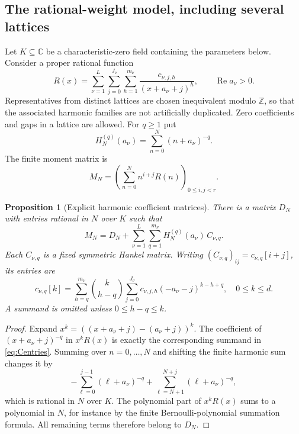 \documentclass[11pt,letterpaper]{article}
\numberwithin{equation}{section}
\newtheorem{proposition}[theorem]{Proposition}
\theoremstyle{definition}\newtheorem{definition}[theorem]{Definition}
\theoremstyle{remark}\newtheorem{remark}[theorem]{Remark}
\DeclareMathOperator{\Rea}{Re}
\newcommand{\C}{\mathbb C}\newcommand{\Q}{\mathbb Q}\newcommand{\N}{\mathbb N}
\begin{document}
\subsection{The rational-weight model, including several lattices}
Let $K\subseteq\C$ be a characteristic-zero field containing the
parameters below. Consider a proper rational function
\begin{equation}\label{eq:rational-weight}
 R(x)=\sum_{\nu=1}^{L}\sum_{j=0}^{J_\nu}
             \sum_{h=1}^{m_\nu}\frac{c_{\nu,j,h}}{(x+a_\nu+j)^h},
 \qquad \Rea a_\nu>0.
\end{equation}
Representatives from distinct lattices are chosen inequivalent modulo
$\mathbb Z$, so that the associated harmonic families are not artificially
duplicated. Zero coefficients and gaps in a lattice are allowed.
For $q\ge1$ put
\begin{equation}\label{eq:shifted-harmonic}
 H_N^{(q)}(a_\nu)=\sum_{n=0}^N(n+a_\nu)^{-q}.
\end{equation}
The finite moment matrix is
\begin{equation}\label{eq:rational-moment-matrix}
 M_N=\left(\sum_{n=0}^Nn^{i+j}R(n)\right)_{0\le i,j<r}.
\end{equation}

\begin{proposition}[Explicit harmonic coefficient matrices]\label{prop:pencil}
There is a matrix $D_N$ with entries rational in $N$ over $K$ such that
\begin{equation}\label{eq:pencil-decomposition}
 M_N=D_N+\sum_{\nu=1}^L\sum_{q=1}^{m_\nu}
                H_N^{(q)}(a_\nu)\,C_{\nu,q}.
\end{equation}
Each $C_{\nu,q}$ is a fixed symmetric Hankel matrix. Writing
$(C_{\nu,q})_{ij}=c_{\nu,q}[i+j]$, its entries are
\begin{equation}\label{eq:Centries}
 c_{\nu,q}[k]=\sum_{h=q}^{m_\nu}\binom{k}{h-q}
       \sum_{j=0}^{J_\nu}c_{\nu,j,h}(-a_\nu-j)^{k-h+q},
       \quad 0\le k\le d.
\end{equation}
A summand is omitted unless $0\le h-q\le k$.
\end{proposition}
\begin{proof}
Expand $x^k=((x+a_\nu+j)-(a_\nu+j))^k$. The coefficient of
$(x+a_\nu+j)^{-q}$ in $x^kR(x)$ is exactly the corresponding summand
in \eqref{eq:Centries}. Summing over $n=0,\ldots,N$ and shifting the
finite harmonic sum changes it by
\[
 -\sum_{\ell=0}^{j-1}(\ell+a_\nu)^{-q}
 +\sum_{\ell=N+1}^{N+j}(\ell+a_\nu)^{-q},
\]
which is rational in $N$ over $K$. The polynomial part of $x^kR(x)$
sums to a polynomial in $N$, for instance by the finite Bernoulli-polynomial
summation formula. All remaining terms therefore belong to $D_N$.
\end{proof}
\end{document}
